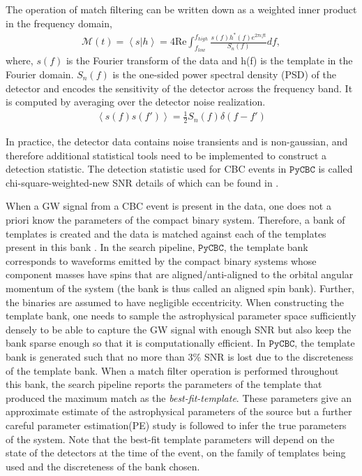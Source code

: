 The operation of match filtering can be written down as a weighted inner product in the frequency domain,
\begin{align}
\label{eq:match}
\mathcal{M}(t) = \left\langle s| h \right\rangle = 4 \mathrm{Re} \int^{f_{high}}_{f_{low}} \frac{s(f) h^{*}(f) e^{2 \pi \iota f t}}{S_{n}(f)} df,
\end{align}
where, $s(f)$ is the Fourier transform of the data and h(f) is the template in the Fourier domain. $S_{n}(f)$ is the one-sided power spectral density (PSD) of the detector and encodes the sensitivity of the detector across the frequency band. It is computed by averaging over the detector noise realization. 
\begin{align}
\left\langle s(f)s(f') \right\rangle = \frac{1}{2} S_{n}(f) \delta(f-f') 
\end{align}

In practice, the detector data contains noise transients and is non-gaussian, and therefore additional statistical tools need to be implemented to construct a detection statistic. The detection statistic used for CBC events in $\texttt{PyCBC}$ is called chi-square-weighted-new SNR details of which can be found in \cite{newSNR1,newSNR2,FindChirp,Usman:2015kfa} . 


When a GW signal from a CBC event is present in the data, one does not a priori know the parameters of the compact binary system. Therefore, a bank of templates is created and the data is matched against each of the templates present in this bank \cite{FindChirp}. In the search pipeline, $\texttt{PyCBC}$, the template bank corresponds to waveforms emitted by the compact binary systems whose component masses have spins that are aligned/anti-aligned to the orbital angular momentum of the system (the bank is thus called an aligned spin bank). Further, the binaries are assumed to have negligible eccentricity. When constructing the template bank, one needs to sample the astrophysical parameter space sufficiently densely to be able to capture the GW signal with enough SNR but also keep the bank sparse enough so that it is computationally efficient. In $\texttt{PyCBC}$, the template bank is generated such that no more than 3\% SNR is lost due to the discreteness of the template bank. When a match filter operation is performed throughout this bank, the search pipeline reports the parameters of the template that produced the maximum match as the \textit{best-fit-template}. These parameters give an approximate estimate of the astrophysical parameters of the source but a further careful parameter estimation(PE) study is followed to infer the true parameters of the system. Note that the best-fit template parameters will depend on the state of the detectors at the time of the event, on the family of templates being used and the discreteness of the bank chosen. 

